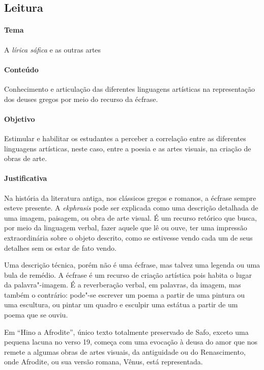 \documentclass[12pt]{extarticle}
\begin{document}
\subsection{Leitura}

\paragraph{Tema} A \emph{lírica sáfica} e as outras artes

\paragraph{Conteúdo} Conhecimento e articulação das diferentes linguagens
artísticas na representação dos deuses gregos por meio do recurso da écfrase.

\paragraph{Objetivo} Estimular e habilitar os estudantes a perceber a 
correlação entre as diferentes linguagens artísticas, neste caso, entre a 
poesia e as artes visuais, na criação de obras de arte. 

\paragraph{Justificativa} Na história da literatura antiga, nos clássicos gregos
e romanos, a écfrase sempre esteve presente. A \textit{ekphrasis} pode ser 
explicada como uma descrição detalhada de uma imagem, paisagem, ou obra de 
arte visual. É um recurso retórico que busca, por meio da linguagem verbal, 
fazer aquele que lê ou ouve, ter uma impressão extraordinária sobre o objeto 
descrito, como se estivesse vendo cada um de seus detalhes sem os estar de fato vendo.

Uma descrição técnica, porém não é uma écfrase, mas talvez uma legenda ou uma
bula de remédio. A écfrase é um recurso de criação artística pois habita o lugar 
da palavra"-imagem. É a reverberação verbal, em palavras, da imagem, mas também 
o contrário: pode"-se escrever um poema a partir de uma pintura ou uma escultura, 
ou pintar um quadro e esculpir uma estátua a partir de um poema que se ouviu. 

Em ``Hino a Afrodite'', único texto totalmente preservado de Safo, exceto 
uma pequena lacuna no verso 19, começa com uma evocação à deusa do amor que
nos remete a algumas obras de artes visuais, da antiguidade ou do Renascimento,
onde Afrodite, ou sua versão romana, Vênus, está representada. 
\end{document}
